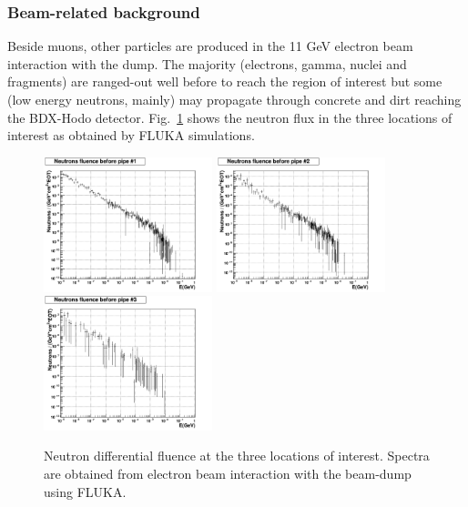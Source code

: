 \subsubsection{Beam-related background}
Beside muons, other particles are produced in the 11 GeV electron beam interaction with the dump.
The majority (electrons, gamma, nuclei and fragments) are ranged-out well before to reach the region of interest but some (low energy neutrons, mainly) may propagate through  concrete and  dirt reaching the BDX-Hodo detector.
Fig.~\ref{fig:nu-comp} shows the neutron flux  in the  three locations of interest as obtained by  FLUKA simulations. 
\begin{figure}[h!] 
\center
\includegraphics[width=4.9cm]{figs/NeutronsPipe1_1D.pdf}
\includegraphics[width=4.9cm]{figs/NeutronsPipe2_1D.pdf}
\includegraphics[width=4.9cm]{figs/NeutronsPipe3_1D.pdf}
\caption {Neutron differential fluence at the three locations of interest. Spectra are obtained from electron beam interaction with the beam-dump using FLUKA.}
\label{fig:nu-comp}
\end{figure}
